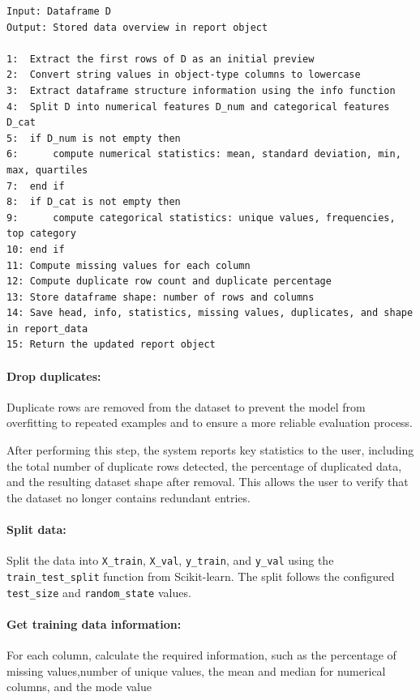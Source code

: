 \begin{lstlisting}[style=algostyle,caption={Data Overview Generation},label={alg:data_overview}]
Input: Dataframe D
Output: Stored data overview in report object

1:  Extract the first rows of D as an initial preview
2:  Convert string values in object-type columns to lowercase
3:  Extract dataframe structure information using the info function
4:  Split D into numerical features D_num and categorical features D_cat
5:  if D_num is not empty then
6:      compute numerical statistics: mean, standard deviation, min, max, quartiles
7:  end if
8:  if D_cat is not empty then
9:      compute categorical statistics: unique values, frequencies, top category
10: end if
11: Compute missing values for each column
12: Compute duplicate row count and duplicate percentage
13: Store dataframe shape: number of rows and columns
14: Save head, info, statistics, missing values, duplicates, and shape in report_data
15: Return the updated report object
\end{lstlisting}
\paragraph{Drop duplicates:}\par

Duplicate rows are removed from the dataset to prevent the model from overfitting to repeated examples and to ensure a more reliable evaluation process.

After performing this step, the system reports key statistics to the user, including the total number of duplicate rows detected, the percentage of duplicated data, and the resulting dataset shape after removal. This allows the user to verify that the dataset no longer contains redundant entries.
\vspace{1cm}
\paragraph{Split data:}\par
Split the data into \texttt{X\_train}, \texttt{X\_val},
\texttt{y\_train}, and \texttt{y\_val} using the
\texttt{train\_test\_split} function from Scikit-learn. The split follows the
configured \texttt{test\_size} and \texttt{random\_state} values.
\vspace{1cm}
\paragraph{Get training data information:}\par
 For each column, calculate the required information,
such as the percentage of missing values,number of unique values, the mean and median for
numerical columns, and the mode value
\vspace{1cm}
